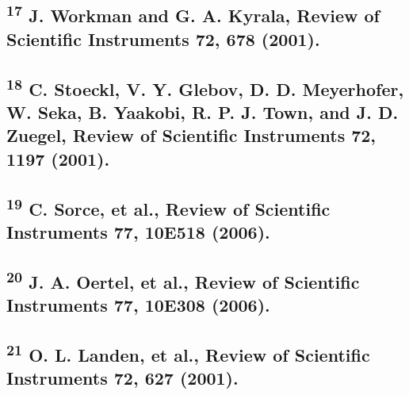 \subsection{\texorpdfstring{\textsuperscript{17} J. Workman and G. A.
Kyrala, Review of Scientific Instruments 72, 678
(2001).}{17 J. Workman and G. A. Kyrala, Review of Scientific Instruments 72, 678 (2001).}}\label{j.-workman-and-g.-a.-kyrala-review-of-scientific-instruments-72-678-2001.}

\subsection{\texorpdfstring{\textsuperscript{18} C. Stoeckl, V. Y.
Glebov, D. D. Meyerhofer, W. Seka, B. Yaakobi, R. P. J. Town, and J. D.
Zuegel, Review of Scientific Instruments 72, 1197
(2001).}{18 C. Stoeckl, V. Y. Glebov, D. D. Meyerhofer, W. Seka, B. Yaakobi, R. P. J. Town, and J. D. Zuegel, Review of Scientific Instruments 72, 1197 (2001).}}\label{c.-stoeckl-v.-y.-glebov-d.-d.-meyerhofer-w.-seka-b.-yaakobi-r.-p.-j.-town-and-j.-d.-zuegel-review-of-scientific-instruments-72-1197-2001.}

\subsection{\texorpdfstring{\textsuperscript{19} C. Sorce, et al.,
Review of Scientific Instruments 77, 10E518
(2006).}{19 C. Sorce, et al., Review of Scientific Instruments 77, 10E518 (2006).}}\label{c.-sorce-et-al.-review-of-scientific-instruments-77-10e518-2006.}

\subsection{\texorpdfstring{\textsuperscript{20} J. A. Oertel, et al.,
Review of Scientific Instruments 77, 10E308
(2006).}{20 J. A. Oertel, et al., Review of Scientific Instruments 77, 10E308 (2006).}}\label{j.-a.-oertel-et-al.-review-of-scientific-instruments-77-10e308-2006.}

\subsection{\texorpdfstring{\textsuperscript{21} O. L. Landen, et al.,
Review of Scientific Instruments 72, 627
(2001).}{21 O. L. Landen, et al., Review of Scientific Instruments 72, 627 (2001).}}\label{o.-l.-landen-et-al.-review-of-scientific-instruments-72-627-2001.}

